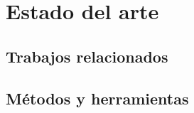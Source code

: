 \chapter{Estado del arte}
\label{chap:estado_arte}




\section{Trabajos relacionados}


\section{Métodos y herramientas}

